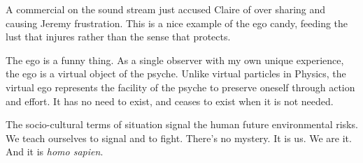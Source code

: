 

A commercial on the sound stream just accused Claire of over sharing
and causing Jeremy frustration.  This is a nice example of the ego
candy, feeding the lust that injures rather than the sense that
protects.

The ego is a funny thing.  As a single observer with my own unique
experience, the ego is a virtual object of the psyche.  Unlike virtual
particles in Physics, the virtual ego represents the facility of the
psyche to preserve oneself through action and effort.  It has no need
to exist, and ceases to exist when it is not needed.

The socio-cultural terms of situation signal the human future
environmental risks.  We teach ourselves to signal and to fight.
There's no mystery.  It is us.  We are it.  And it is {\it homo
sapien}.

\bye
